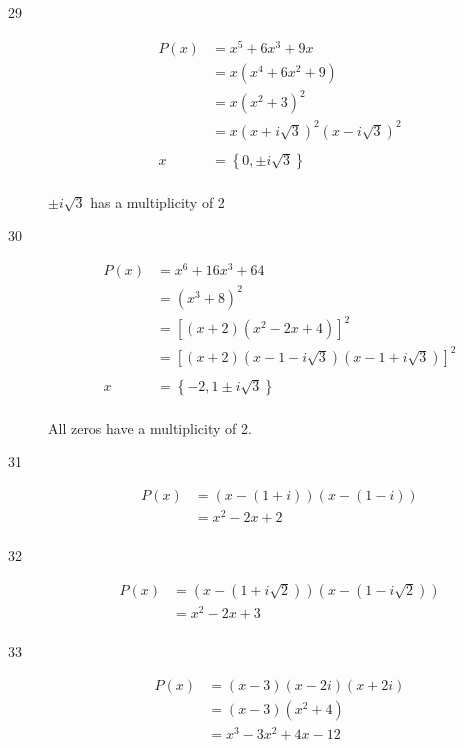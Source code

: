\documentclass{exam}
\begin{document}
\begin{description}
      \item[29] 
        \begin{align*}
          P(x) &= x^5 + 6x^3 + 9x \\
               &= x(x^4 + 6x^2 + 9) \\
               &= x(x^2 + 3)^2 \\
               &= x(x + i \sqrt{3})^2(x - i \sqrt{3})^2 \\
               \\
          x    &= \boxed{\left\{ 0, \pm i \sqrt{3} \right\}} \\
        \end{align*}

        $\pm i \sqrt{3}$ has a multiplicity of 2

      \item[30] 
        \begin{align*}
          P(x) &= x^6 + 16x^3 + 64 \\
               &= (x^3 + 8)^2 \\
               &= \left[ (x + 2)(x^2 - 2x + 4) \right]^2 \\
               &= \left[ (x + 2)(x - 1 - i \sqrt{3})(x - 1 + i \sqrt{3}) \right]^2 \\
               \\
          x    &= \boxed{\left\{ -2, 1 \pm i \sqrt{3} \right\}} \\
        \end{align*}

        All zeros have a multiplicity of 2.

      \item[31]
        \begin{align*}
          P(x) &= (x - (1 + i)) (x - (1 - i)) \\
               &= \boxed{x^2 - 2x + 2} \\
        \end{align*}

      \item[32]
        \begin{align*}
          P(x) &= (x - (1 + i \sqrt{2})) (x - (1 - i \sqrt{2})) \\
               &= \boxed{x^2 - 2x + 3} \\
        \end{align*}

      \item[33]
        \begin{align*}
          P(x) &= (x - 3) (x - 2i) (x + 2i) \\
               &= (x - 3) (x^2 + 4)\\
               &= \boxed{x^3 - 3x^2 + 4x - 12} \\
        \end{align*}


\end{description}
\end{document}

